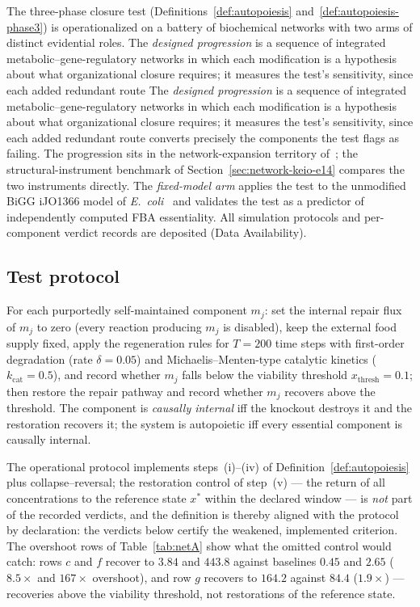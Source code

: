\documentclass[11pt,a4paper]{article}
\theoremstyle{plain}
\theoremstyle{definition}
\theoremstyle{remark}
\begin{document}
The three-phase closure test (Definitions~\ref{def:autopoiesis}
and~\ref{def:autopoiesis-phase3}) is operationalized on a battery
of biochemical networks with two arms of distinct evidential roles.
The \emph{designed progression} is a sequence of integrated
metabolic--gene-regulatory networks in which each modification is
a hypothesis about what organizational closure requires; it
measures the test's sensitivity, since each added redundant route
The \emph{designed progression} is a sequence of integrated
metabolic--gene-regulatory networks in which each modification is
a hypothesis about what organizational closure requires; it
measures the test's sensitivity, since each added redundant route
converts precisely the components the test flags as failing. The
progression sits in the network-expansion territory
of~\citet{handorf2005network}; the structural-instrument benchmark
of Section~\ref{sec:network-keio-e14} compares the two instruments
directly. The
\emph{fixed-model arm} applies the test to the unmodified BiGG
iJO1366 model of \emph{E.~coli}~\cite{orth2011} and validates the
test as a predictor of independently computed FBA essentiality.
All simulation protocols and per-component verdict records are
deposited (Data Availability).

\subsection{Test protocol}

For each purportedly self-maintained component $m_j$: set the
internal repair flux of $m_j$ to zero (every reaction producing
$m_j$ is disabled), keep the external food supply fixed, apply the
regeneration rules for $T=200$ time steps with first-order
degradation (rate $\delta=0.05$) and Michaelis--Menten-type
catalytic kinetics ($k_{\mathrm{cat}}=0.5$), and record whether
$m_j$ falls below the viability threshold
$x_{\mathrm{thresh}}=0.1$; then restore the repair pathway and
record whether $m_j$ recovers above the threshold. The component
is \emph{causally internal} iff the knockout destroys it and the
restoration recovers it; the system is autopoietic iff every
essential component is causally internal.

The operational protocol implements steps~(i)--(iv) of
Definition~\ref{def:autopoiesis} plus collapse--reversal; the
restoration control of step~(v) --- the return of all concentrations
to the reference state $x^{*}$ within the declared window --- is
\emph{not} part of the recorded verdicts, and the definition is
thereby aligned with the protocol by declaration: the verdicts
below certify the weakened, implemented criterion. The overshoot
rows of Table~\ref{tab:netA} show what the omitted control would
catch: rows $c$ and $f$ recover to $3.84$ and $443.8$ against
baselines $0.45$ and $2.65$ ($8.5\times$ and $167\times$
overshoot), and row $g$ recovers to $164.2$ against $84.4$
($1.9\times$) --- recoveries above the viability threshold, not
restorations of the reference state.
\end{document}
